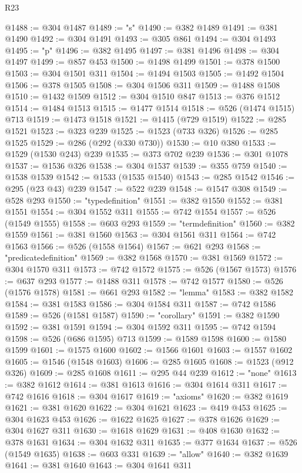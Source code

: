 \begin{lexlean}{R23}
\begin{coremodule}
@1488 := @304 @1487
@1489 := "s"
@1490 := @382 @1489
@1491 := @381 @1490
@1492 := @304 @1491
@1493 := @305 @861
@1494 := @304 @1493
@1495 := "p"
@1496 := @382 @1495
@1497 := @381 @1496
@1498 := @304 @1497
@1499 := @857 @453
@1500 := @1498 @1499
@1501 := @378 @1500
@1503 := @304 @1501 @311
@1504 := @1494 @1503
@1505 := @1492 @1504
@1506 := @378 @1505
@1508 := @304 @1506 @311
@1509 := @1488 @1508
@1510 := @1432 @1509
@1512 := @304 @1510 @847
@1513 := @376 @1512
@1514 := @1484 @1513
@1515 := @1477 @1514
@1518 := @526 (@1474 @1515) @713
@1519 := @1473 @1518
@1521 := @1415 (@729 @1519)
@1522 := @285 @1521
@1523 := @323 @239
@1525 := @1523 (@733 @326)
@1526 := @285 @1525
@1529 := @286 (@292 (@330 @730))
@1530 := @10 @380
@1533 := @1529 (@1530 @243) @239
@1535 := @373 @702 @239
@1536 := @301 @1078
@1537 := @1536 @326
@1538 := @304 @1537
@1539 := @355 @759
@1540 := @1538 @1539
@1542 := @1533 (@1535 @1540)
@1543 := @285 @1542
@1546 := @295 (@23 @43) @239
@1547 := @522 @239
@1548 := @1547 @308
@1549 := @528 @293
@1550 := "typedefinition"
@1551 := @382 @1550
@1552 := @381 @1551
@1554 := @304 @1552 @311
@1555 := @742 @1554
@1557 := @526 (@1549 @1555)
@1558 := @603 @293
@1559 := "termdefinition"
@1560 := @382 @1559
@1561 := @381 @1560
@1563 := @304 @1561 @311
@1564 := @742 @1563
@1566 := @526 (@1558 @1564)
@1567 := @621 @293
@1568 := "predicatedefinition"
@1569 := @382 @1568
@1570 := @381 @1569
@1572 := @304 @1570 @311
@1573 := @742 @1572
@1575 := @526 (@1567 @1573)
@1576 := @637 @293
@1577 := @1488 @311
@1578 := @742 @1577
@1580 := @526 (@1576 @1578)
@1581 := @661 @293
@1582 := "lemma"
@1583 := @382 @1582
@1584 := @381 @1583
@1586 := @304 @1584 @311
@1587 := @742 @1586
@1589 := @526 (@1581 @1587)
@1590 := "corollary"
@1591 := @382 @1590
@1592 := @381 @1591
@1594 := @304 @1592 @311
@1595 := @742 @1594
@1598 := @526 (@686 @1595) @713
@1599 := @1589 @1598
@1600 := @1580 @1599
@1601 := @1575 @1600
@1602 := @1566 @1601
@1603 := @1557 @1602
@1605 := @1546 (@1548 @1603)
@1606 := @285 @1605
@1608 := @1523 (@912 @326)
@1609 := @285 @1608
@1611 := @295 @44 @239
@1612 := "none"
@1613 := @382 @1612
@1614 := @381 @1613
@1616 := @304 @1614 @311
@1617 := @742 @1616
@1618 := @304 @1617
@1619 := "axioms"
@1620 := @382 @1619
@1621 := @381 @1620
@1622 := @304 @1621
@1623 := @419 @453
@1625 := @304 @1623 @453
@1626 := @1622 @1625
@1627 := @378 @1626
@1629 := @304 @1627 @311
@1630 := @1618 @1629
@1631 := @408 @1630
@1632 := @378 @1631
@1634 := @304 @1632 @311
@1635 := @377 @1634
@1637 := @526 (@1549 @1635)
@1638 := @603 @331
@1639 := "allow"
@1640 := @382 @1639
@1641 := @381 @1640
@1643 := @304 @1641 @311

\end{coremodule}
\end{lexlean}
